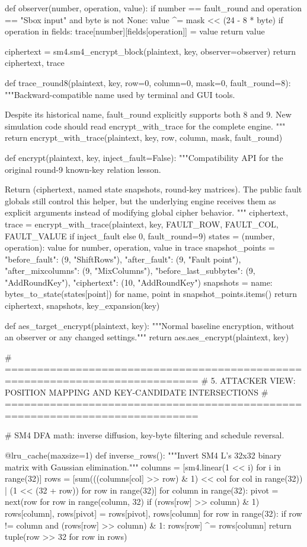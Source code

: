 \begin{lightcode}[numbers=left,firstnumber=1]
    def observer(number, operation, value):
        if number == fault_round and operation == "Sbox input" and byte is not None:
            value ^= mask << (24 - 8 * byte)
        if operation in fields:
            trace[number][fields[operation]] = value
        return value

    ciphertext = sm4.sm4_encrypt_block(plaintext, key, observer=observer)
    return ciphertext, trace


def trace_round8(plaintext, key, row=0, column=0, mask=0, fault_round=8):
    """Backward-compatible name used by terminal and GUI tools.

    Despite its historical name, fault_round explicitly supports both 8 and 9.
    New simulation code should read encrypt_with_trace for the complete engine.
    """
    return encrypt_with_trace(plaintext, key, row, column, mask, fault_round)


def encrypt(plaintext, key, inject_fault=False):
    """Compatibility API for the original round-9 known-key relation lesson.

    Return (ciphertext, named state snapshots, round-key matrices). The public
    fault globals still control this helper, but the underlying engine receives
    them as explicit arguments instead of modifying global cipher behavior.
    """
    ciphertext, trace = encrypt_with_trace(plaintext, key, FAULT_ROW, FAULT_COL, FAULT_VALUE if inject_fault else 0, fault_round=9)
    states = {(number, operation): value for number, operation, value in trace}
    snapshot_points = {"before_fault": (9, "ShiftRows"), "after_fault": (9, "Fault point"), "after_mixcolumns": (9, "MixColumns"), "before_last_subbytes": (9, "AddRoundKey"), "ciphertext": (10, "AddRoundKey")}
    snapshots = {name: bytes_to_state(states[point]) for name, point in snapshot_points.items()}
    return ciphertext, snapshots, key_expansion(key)


def aes_target_encrypt(plaintext, key):
    """Normal baseline encryption, without an observer or any changed settings."""
    return aes.aes_encrypt(plaintext, key)


# ============================================================================
# 5. ATTACKER VIEW: POSITION MAPPING AND KEY-CANDIDATE INTERSECTIONS
# ============================================================================


# SM4 DFA math: inverse diffusion, key-byte filtering and schedule reversal.

@lru_cache(maxsize=1)
def inverse_rows():
    """Invert SM4 L's 32x32 binary matrix with Gaussian elimination."""
    columns = [sm4.linear(1 << i) for i in range(32)]
    rows = [sum(((columns[col] >> row) & 1) << col for col in range(32)) | (1 << (32 + row)) for row in range(32)]
    for column in range(32):
        pivot = next(row for row in range(column, 32) if (rows[row] >> column) & 1)
        rows[column], rows[pivot] = rows[pivot], rows[column]
        for row in range(32):
            if row != column and (rows[row] >> column) & 1:
                rows[row] ^= rows[column]
    return tuple(row >> 32 for row in rows)



\end{lightcode}
